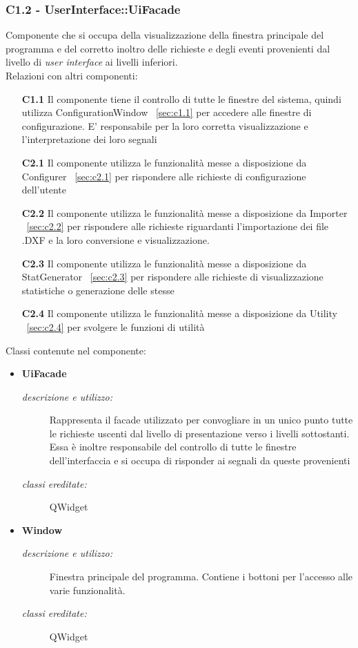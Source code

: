 \subsubsection{C1.2 - UserInterface::UiFacade} \label{sec:c1.2}
Componente che si occupa della visualizzazione della finestra principale del programma e del corretto inoltro delle richieste e degli eventi provenienti dal livello di \textit{user interface} ai livelli inferiori.\\
Relazioni con altri componenti: 
\begin{itemize} 
\item [\textbf{C1.1}]
Il componente tiene il controllo di tutte le finestre del sistema, quindi utilizza ConfigurationWindow ~\ref{sec:c1.1} per accedere alle finestre di configurazione. E' responsabile per la loro corretta visualizzazione e l'interpretazione dei loro segnali 
\item [\textbf{C2.1}]
Il componente utilizza le funzionalità messe a disposizione da Configurer ~\ref{sec:c2.1} per rispondere alle richieste di configurazione dell'utente 
\item [\textbf{C2.2}]
Il componente utilizza le funzionalità messe a disposizione da Importer ~\ref{sec:c2.2} per rispondere alle richieste riguardanti l'importazione dei file .DXF e la loro conversione e visualizzazione. 
\item [\textbf{C2.3}]
Il componente utilizza le funzionalità messe a disposizione da StatGenerator ~\ref{sec:c2.3} per rispondere alle richieste di visualizzazione statistiche o generazione delle stesse 
\item [\textbf{C2.4}]
Il componente utilizza le funzionalità messe a disposizione da Utility ~\ref{sec:c2.4} per svolgere le funzioni di utilità 
\end{itemize} 

Classi contenute nel componente: 
\begin{itemize} 
\item \textbf{UiFacade}
\begin{description}
\item [\textit{descrizione e utilizzo:}] Rappresenta il facade utilizzato per convogliare in un unico punto tutte le richieste uscenti dal livello di presentazione verso i livelli sottostanti. Essa è inoltre responsabile del controllo di tutte le finestre dell'interfaccia e si occupa di risponder ai segnali da queste provenienti
\item [\textit{classi ereditate:}] QWidget
\end{description}
\item \textbf{Window}
\begin{description}
\item [\textit{descrizione e utilizzo:}] Finestra principale del programma. Contiene i bottoni per l'accesso alle varie funzionalità.
\item [\textit{classi ereditate:}] QWidget
\end{description}
\end{itemize}

